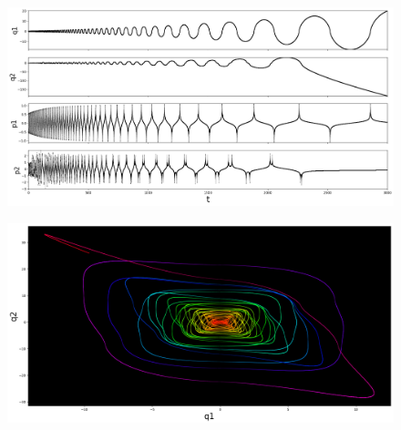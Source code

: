 \documentclass{article}
\begin{document}
\pagestyle{empty}

\begin{figure}
    \centering
    \includegraphics[width=19cm]{result.png}
\end{figure}

\begin{figure}
    \centering
    \includegraphics[width=19cm]{result2.png}
\end{figure}
\end{document}
